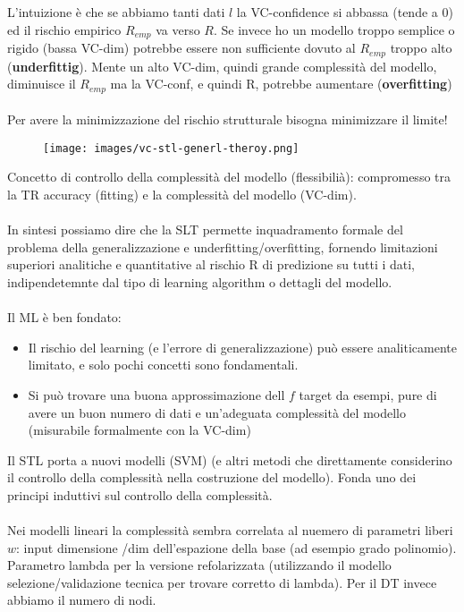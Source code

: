 L'intuizione è che se abbiamo tanti dati $l$ la VC-confidence si abbassa (tende a 0) ed il rischio empirico $R_{emp}$ va verso $R$.
Se invece ho un modello troppo semplice o rigido (bassa VC-dim) potrebbe essere non sufficiente dovuto al $R_{emp}$ troppo alto (\textbf{underfittig}).
Mente un alto VC-dim, quindi grande complessità del modello, diminuisce il $R_{emp}$ ma la VC-conf, e quindi R, potrebbe aumentare (\textbf{overfitting})\\\\
Per avere la minimizzazione del rischio strutturale bisogna minimizzare il limite!
\begin{figure}[h!]
    \centering
    \texttt{[image: images/vc-stl-generl-theroy.png]}
\end{figure}

\hspace{-15pt}Concetto di controllo della complessità del modello (flessibilià): compromesso tra la TR accuracy (fitting)
e la complessità del modello (VC-dim).\\\\
In sintesi possiamo dire che la SLT permette inquadramento formale del problema della generalizzazione e underfitting/overfitting, 
fornendo limitazioni superiori analitiche e quantitative al rischio R di predizione su tutti i dati, indipendetemnte dal tipo di learning algorithm 
o dettagli del modello.\\\\
Il ML è ben fondato:
\begin{itemize}
    \item Il rischio del learning (e l'errore di generalizzazione) può essere analiticamente limitato, e solo pochi concetti sono fondamentali.
    \item Si può trovare una buona approssimazione dell $f$ target da esempi, pure di avere un buon numero di dati e un'adeguata complessità del modello (misurabile 
    formalmente con la VC-dim)
\end{itemize}
Il STL porta a nuovi modelli (SVM) (e altri metodi che direttamente considerino il controllo della complessità nella costruzione del modello). 
Fonda uno dei principi induttivi sul controllo della complessità.\\\\
Nei modelli lineari la complessità sembra correlata al nuemero di parametri liberi $w$: input dimensione /dim dell'espazione della base (ad esempio grado polinomio).
Parametro lambda per la versione refolarizzata (utilizzando il modello selezione/validazione tecnica per trovare corretto di lambda).
Per il DT invece abbiamo il numero di nodi.